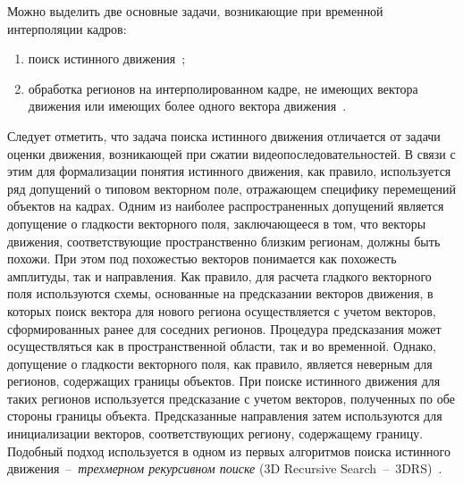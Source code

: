 Можно выделить две основные задачи, возникающие при временной интерполяции кадров:
\begin{enumerate}
\item поиск истинного движения~\cite{Haan1993};
\item обработка регионов на интерполированном кадре, не имеющих вектора движения или имеющих более одного вектора движения~\cite{Bartels2009}.
\end{enumerate}
Следует отметить, что задача поиска истинного движения отличается от задачи оценки движения, возникающей при сжатии видеопоследовательностей. В связи с этим для формализации понятия истинного движения, как правило, используется ряд допущений о типовом векторном поле, отражающем специфику перемещений объектов на кадрах. Одним из наиболее распространенных допущений является допущение о гладкости векторного поля, заключающееся в том, что векторы движения, соответствующие пространственно близким регионам, должны быть похожи. При этом под похожестью векторов понимается как похожесть амплитуды, так и направления. Как правило, для расчета гладкого векторного поля используются схемы, основанные на предсказании векторов движения, в которых поиск вектора для нового региона осуществляется с учетом векторов, сформированных ранее для соседних регионов. Процедура предсказания может осуществляться как в пространственной области, так и во временной. Однако, допущение о гладкости векторного поля, как правило, является неверным для регионов, содержащих границы объектов. При поиске истинного движения для таких регионов используется предсказание с учетом векторов, полученных по обе стороны границы объекта. Предсказанные направления затем используются для инициализации векторов, соответствующих региону, содержащему границу. Подобный подход используется в одном из первых алгоритмов поиска истинного движения~--~\emph{трехмерном рекурсивном поиске} (3D Recursive Search~--~3DRS)~\cite{Haan1993}.

